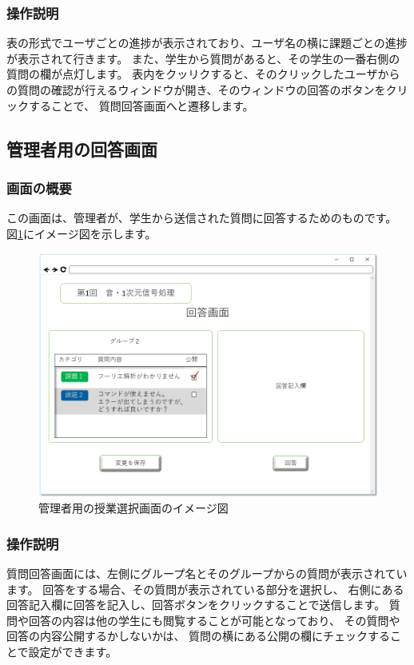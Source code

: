 \subsubsection{操作説明}
表の形式でユーザごとの進捗が表示されており、ユーザ名の横に課題ごとの進捗が表示されて行きます。
また、学生から質問があると、その学生の一番右側の質問の欄が点灯します。
表内をクッリクすると、そのクリックしたユーザからの質問の確認が行えるウィンドウが開き、そのウィンドウの回答のボタンをクリックすることで、
質問回答画面へと遷移します。

\subsection{管理者用の回答画面}
\subsubsection{画面の概要}
この画面は、管理者が、学生から送信された質問に回答するためのものです。
図\ref{fig:sc_answer}にイメージ図を示します。

\begin{figure}[htbp]
\begin{center}
  \includegraphics[width=1\linewidth,clip]{./img/sc_answer.png}
  \caption{管理者用の授業選択画面のイメージ図}\label{fig:sc_answer}
\end{center}
\end{figure}

\subsubsection{操作説明}
質問回答画面には、左側にグループ名とそのグループからの質問が表示されています。
回答をする場合、その質問が表示されている部分を選択し、
右側にある回答記入欄に回答を記入し、回答ボタンをクリックすることで送信します。
質問や回答の内容は他の学生にも閲覧することが可能となっており、
その質問や回答の内容公開するかしないかは、
質問の横にある公開の欄にチェックすることで設定ができます。


